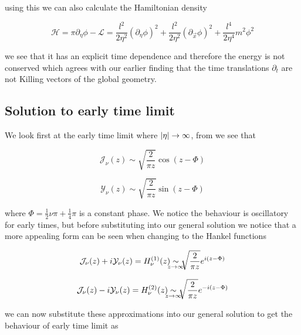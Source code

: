 \documentclass[a4paper,11pt]{article}
\newcommand\underrel[3][]{\mathrel{\mathop{#3}\limits_{%
      \ifx c#1\relax\mathclap{#2}\else#2\fi}}}
\numberwithin{equation}{section}
\numberwithin{figure}{section}
\begin{document}
\begin{large}
using this we can also calculate the Hamiltonian density

\begin{equation}
\label{classicHam}    
    \mathcal{H}=\pi\partial_\eta\phi-\mathcal{L}=\frac{l^2}{2\eta^2} (\partial_\eta\phi)^2+\frac{l^2}{2\eta^2}(\partial_{\Vec{x}}\phi)^2+\frac{l^4}{2\eta^4}m^2\phi^2
\end{equation}

we see that it has an explicit time dependence and therefore the energy is not conserved which agrees with our earlier finding that the time translations $\partial_t$ are not Killing vectors of the global geometry.


\subsection{Solution to early time limit}

We look first at the early time limit where $\abs{\eta}\rightarrow\infty$, from \cite{limitingform} we see that 

\begin{equation}
\label{J(z) z>>1}    
    \mathcal{J}_\nu(z)\sim \sqrt{\frac{2}{\pi z}}\cos(z-\Phi)
\end{equation}

\begin{equation}
\label{Y(z) z>>1}    
    \mathcal{Y}_\nu(z)\sim \sqrt{\frac{2}{\pi z}}\sin(z-\Phi)
\end{equation}

where $\Phi=\frac{1}{2}\nu\pi+\frac{1}{4}\pi$ is a constant phase. We notice the behaviour is oscillatory for early times, but before substituting into our general solution we notice that a more appealing form can be seen when changing to the Hankel functions


\begin{equation}
\label{H1 z>>1}    
    \mathcal{J}_\nu(z)+i\mathcal{Y}_\nu(z)=H^{(1)}_\nu(z)\underrel[c]{z\to \infty}{\sim}\sqrt{\frac{2}{\pi z}}e^{i(z-\Phi)}
\end{equation}

\begin{equation}
\label{H2 z>>1}    
    \mathcal{J}_\nu(z)-i\mathcal{Y}_\nu(z)=H^{(2)}_\nu(z)\underrel[c]{z\to \infty}{\sim}\sqrt{\frac{2}{\pi z}}e^{-i(z-\Phi)}
\end{equation}

we can now substitute these approximations into our general solution to get the behaviour of early time limit as


\end{large}
\end{document}

